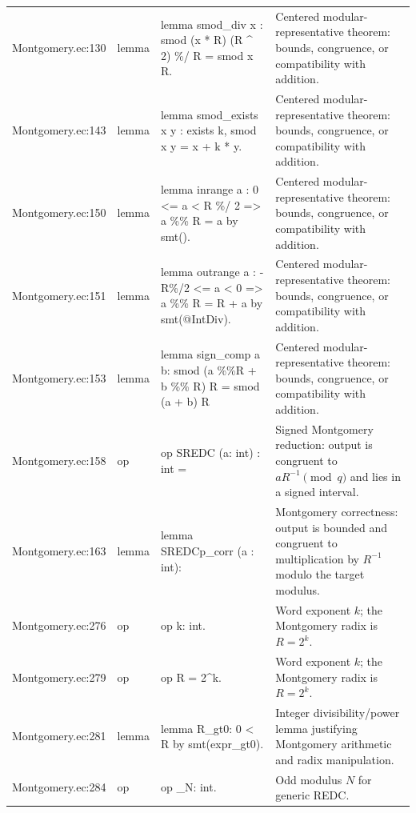\documentclass[10pt]{article}
\begin{document}
\begin{longtable}{L{0.11\textwidth}L{0.05\textwidth}L{0.38\textwidth}L{0.42\textwidth}}
Montgomery.\allowbreak{}ec:\allowbreak{}130 & lemma & {\ttfamily\scriptsize lemma smod\_div x : smod (x * R) (R \textasciicircum{} 2) \%/ R = smod x  R.} & Centered modular-representative theorem: bounds, congruence, or compatibility with addition. \\
Montgomery.\allowbreak{}ec:\allowbreak{}143 & lemma & {\ttfamily\scriptsize lemma smod\_exists x y : exists k, smod x y = x + k * y.} & Centered modular-representative theorem: bounds, congruence, or compatibility with addition. \\
Montgomery.\allowbreak{}ec:\allowbreak{}150 & lemma & {\ttfamily\scriptsize lemma inrange a :  0 <= a < R \%/ 2 => a \%\% R = a by smt().} & Centered modular-representative theorem: bounds, congruence, or compatibility with addition. \\
Montgomery.\allowbreak{}ec:\allowbreak{}151 & lemma & {\ttfamily\scriptsize lemma outrange a :  - R\%/2 <= a < 0 => a \%\% R = R + a by smt(@IntDiv).} & Centered modular-representative theorem: bounds, congruence, or compatibility with addition. \\
Montgomery.\allowbreak{}ec:\allowbreak{}153 & lemma & {\ttfamily\scriptsize lemma sign\_comp a b: smod (a \%\%R + b \%\% R) R = smod (a + b) R} & Centered modular-representative theorem: bounds, congruence, or compatibility with addition. \\
Montgomery.\allowbreak{}ec:\allowbreak{}158 & op & {\ttfamily\scriptsize op SREDC (a: int) : int =} & Signed Montgomery reduction: output is congruent to $aR^{-1}\pmod q$ and lies in a signed interval. \\
Montgomery.\allowbreak{}ec:\allowbreak{}163 & lemma & {\ttfamily\scriptsize lemma SREDCp\_corr (a : int):} & Montgomery correctness: output is bounded and congruent to multiplication by $R^{-1}$ modulo the target modulus. \\
Montgomery.\allowbreak{}ec:\allowbreak{}276 & op & {\ttfamily\scriptsize op k: int.} & Word exponent $k$; the Montgomery radix is $R=2^k$. \\
Montgomery.\allowbreak{}ec:\allowbreak{}279 & op & {\ttfamily\scriptsize op R = 2\textasciicircum{}k.} & Word exponent $k$; the Montgomery radix is $R=2^k$. \\
Montgomery.\allowbreak{}ec:\allowbreak{}281 & lemma & {\ttfamily\scriptsize lemma R\_gt0: 0 < R by smt(expr\_gt0).} & Integer divisibility/power lemma justifying Montgomery arithmetic and radix manipulation. \\
Montgomery.\allowbreak{}ec:\allowbreak{}284 & op & {\ttfamily\scriptsize op \_N: int.} & Odd modulus $N$ for generic REDC. \\

\end{longtable}
\end{document}
